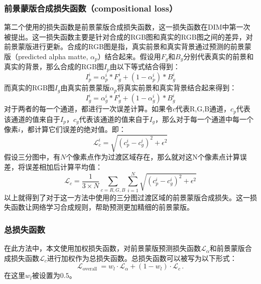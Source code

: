 \documentclass[supercite]{HustGraduPaper}
\begin{document}
    \subsubsection{前景蒙版合成损失函数（compositional loss）}
    第二个使用的损失函数是前景蒙版合成损失函数，这一损失函数在DIM中第一次被提出。这一损失函数主要是针对合成的RGB图和真实的RGB图之间的差异，对前景蒙版进行更新。合成的RGB图是指，真实前景和真实背景通过预测的前景蒙版（predicted alpha matte, $\alpha_p$）结合起来。假设用$F_g$和$B_g$分别代表真实的前景和真实的背景，那么合成的RGB图$I_p$由以下等式结合得到：
    \begin{equation}
        I_p^i = \alpha_p^i*F_g^i+(1-\alpha_p^i)*B_g^i
    \end{equation}
    而真实的RGB图$I_g$由真实前景蒙版$\alpha_p$将真实前景和真实背景结合起来得到：
    \begin{equation}
        I_g^i = \alpha_g^i*F_g^i+(1-\alpha_g^i)*B_g^i
    \end{equation}
    对于两者的每一个通道，都进行一次误差计算。如果令$c$代表R,G,B通道，$c_p$代表该通道的值来自于$I_p$，$c_g$代表该通道的值来自于$I_g$，那么对于每一个通道中每一个像素$i$，都计算它们误差的绝对值。即：
    \begin{equation}
        \mathcal{L}_{c}^{i}=\sqrt{\left(c_{p}^{i}-c_{g}^{i}\right)^{2}+\epsilon^{2}}
    \end{equation}
    假设三分图中，有$N$个像素点作为过渡区域存在，那么就对这N个像素点计算误差，将误差相加后计算平均值：
    \begin{equation}
        \mathcal{L}_{c}=\frac{1}{3 \times N}\sum_{c=R,G,B}\sum_{i=1}^{N}\sqrt{\left(c_{p}^{i}-c_{g}^{i}\right)^{2}+\epsilon^{2}}
    \end{equation}
    以上就得到了对于这一方法中使用的三分图过渡区域的前景蒙版合成损失。这一损失函数让网络学习合成规则，帮助预测更加精细的前景蒙版。
    
    \subsubsection{总损失函数}
    在此方法中，本文使用加权损失函数，对前景蒙版预测损失函数$\mathcal{L}_{\alpha}$和前景蒙版合成损失函数$\mathcal{L}_{c}$进行加权作为总损失函数。总损失函数可以被写为以下形式：
    \begin{equation}
        \mathcal{L}_{\text {overall }}=w_{l} \cdot \mathcal{L}_{\alpha}+\left(1-w_{l}\right) \cdot \mathcal{L}_{c}\,.
    \end{equation}
    在这里$w_{l}$被设置为$0.5$。
    
\end{document}
